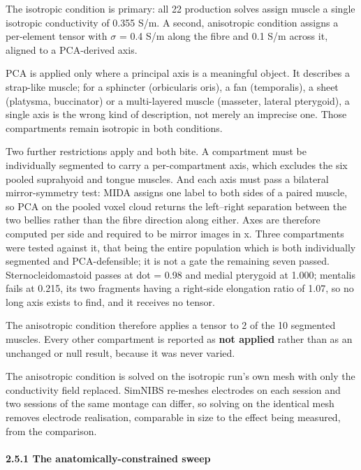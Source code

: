 \documentclass[
  11pt,
  a4paper,
]{article}
\begin{document}
The isotropic condition is primary: all 22 production solves assign muscle a
single isotropic conductivity of 0.355 S/m. A second, anisotropic condition
assigns a per-element tensor with $\sigma$ = 0.4 S/m along the fibre and 0.1 S/m across
it, aligned to a PCA-derived axis.

PCA is applied only where a principal axis is a meaningful object. It describes
a strap-like muscle; for a sphincter (orbicularis oris), a fan (temporalis), a
sheet (platysma, buccinator) or a multi-layered muscle (masseter, lateral
pterygoid), a single axis is the wrong kind of description, not merely an
imprecise one. Those compartments remain isotropic in both conditions.

Two further restrictions apply and both bite. A compartment must be individually
segmented to carry a per-compartment axis, which excludes the six pooled
suprahyoid and tongue muscles. And each axis must pass a bilateral
mirror-symmetry test: MIDA assigns one label to both sides of a paired muscle,
so PCA on the pooled voxel cloud returns the left--right separation between the
two bellies rather than the fibre direction along either. Axes are therefore
computed per side and required to be mirror images in x. Three compartments were
tested against it, that being the entire population which is both individually
segmented and PCA-defensible; it is not a gate the remaining seven passed.
Sternocleidomastoid
passes at \textbar dot\textbar{} = 0.98 and medial pterygoid at 1.000; mentalis fails at 0.215,
its two fragments having a right-side elongation ratio of 1.07, so no long axis
exists to find, and it receives no tensor.

The anisotropic condition therefore applies a tensor to 2 of the 10 segmented
muscles. Every other compartment is reported as \textbf{not applied} rather than as
an unchanged or null result, because it was never varied.

The anisotropic condition is solved on the isotropic run's own mesh with only
the conductivity field replaced. SimNIBS re-meshes electrodes on each session
and two sessions of the same montage can differ, so solving on the identical
mesh removes electrode realisation, comparable in size to the effect being
measured, from the comparison.

\paragraph{2.5.1 The anatomically-constrained sweep}\label{the-anatomically-constrained-sweep}
\end{document}
